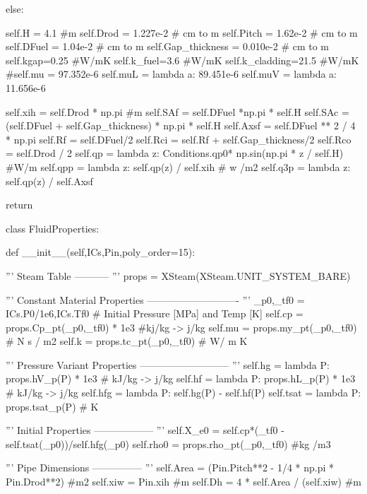 \documentclass{article}
\begin{document}
\begin{python}
        else:
            
            self.H = 4.1 #m
            self.Drod = 1.227e-2 # cm to m
            self.Pitch = 1.62e-2 # cm to m 
            self.DFuel = 1.04e-2 # cm to m 
            self.Gap_thickness = 0.010e-2 # cm to m
            self.kgap=0.25 #W/mK
            self.k_fuel=3.6 #W/mK
            self.k_cladding=21.5 #W/mK
            #self.mu = 97.352e-6
            self.muL = lambda a: 89.451e-6
            self.muV = lambda a: 11.656e-6

        
        self.xih = self.Drod * np.pi #m
        self.SAf = self.DFuel *np.pi * self.H
        self.SAc = (self.DFuel + self.Gap_thickness) * np.pi * self.H
        self.Axsf = self.DFuel ** 2 / 4 * np.pi
        self.Rf = self.DFuel/2
        self.Rci = self.Rf + self.Gap_thickness/2
        self.Rco = self.Drod / 2 
        self.qp = lambda z: Conditions.qp0* np.sin(np.pi * z / self.H) #W/m
        self.qpp = lambda z: self.qp(z) / self.xih # w /m2
        self.q3p = lambda z: self.qp(z) / self.Axsf
        
        return

class FluidProperties:
    
    def __init__(self,ICs,Pin,poly_order=15):
        
        '''
        Steam Table
        -----------
        '''
        props = XSteam(XSteam.UNIT_SYSTEM_BARE)
        
        '''
        Constant Material Properties 
        ----------------------------
        '''
        _p0,_tf0 = ICs.P0/1e6,ICs.Tf0 # Initial Pressure [MPa] and Temp [K]
        self.cp = props.Cp_pt(_p0,_tf0) * 1e3 #kj/kg -> j/kg
        self.mu = props.my_pt(_p0,_tf0)  # N s / m2
        self.k = props.tc_pt(_p0,_tf0)  # W/ m K

        '''
        Pressure Variant Properties
        ---------------------------
        '''
        self.hg = lambda P: props.hV_p(P) * 1e3 # kJ/kg -> j/kg
        self.hf = lambda P: props.hL_p(P) * 1e3 # kJ/kg -> j/kg
        self.hfg = lambda P: self.hg(P) - self.hf(P)
        self.tsat = lambda P: props.tsat_p(P) # K

        '''
        Initial Properties
        ------------------
        '''
        self.X_e0 = self.cp*(_tf0 - self.tsat(_p0))/self.hfg(_p0)
        self.rho0 = props.rho_pt(_p0,_tf0) #kg /m3

        '''
        Pipe Dimensions
        ---------------
        '''
        self.Area = (Pin.Pitch**2 - 1/4 * np.pi * Pin.Drod**2) #m2
        self.xiw = Pin.xih #m
        self.Dh = 4 * self.Area / (self.xiw) #m
        

\end{python}
\end{document}
